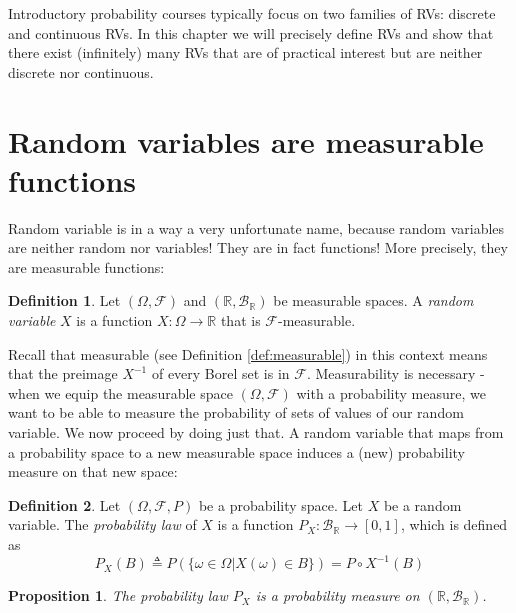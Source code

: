 \documentclass{book}
\theoremstyle{plain}%
\newtheorem{proposition}{Proposition}[section]
\theoremstyle{definition}
\newtheorem{definition}{Definition}[section]
\newlength{\arrow}
\begin{document}
Introductory probability courses typically focus on two families of RVs: discrete and continuous RVs. In this chapter we will precisely define RVs and show that there exist (infinitely) many RVs that are of practical interest but are neither discrete nor continuous.

\section{Random variables are measurable functions}

Random variable is in a way a very unfortunate name, because random variables are neither random nor variables! They are in fact functions! More precisely, they are measurable functions:

\begin{definition}
Let $(\Omega, \mathcal{F})$ and $(\mathbb{R}, \mathcal{B}_\mathbb{R})$ be measurable spaces. A \emph{random variable} $X$ is a function $X: \Omega \rightarrow \mathbb{R}$ that is $\mathcal{F}$-measurable. 
\end{definition}

Recall that measurable (see Definition \ref{def:measurable}) in this context means that the preimage $X^{-1}$ of every Borel set is in $\mathcal{F}$. Measurability is necessary - when we equip the measurable space $(\Omega, \mathcal{F})$ with a probability measure, we want to be able to measure the probability of sets of values of our random variable. We now proceed by doing just that. A random variable that maps from a probability space to a new measurable space induces a (new) probability measure on that new space:

\begin{definition}
Let $(\Omega, \mathcal{F}, P)$ be a probability space. Let $X$ be a random variable. The \emph{probability law} of $X$ is a function $P_X: \mathcal{B}_\mathbb{R} \rightarrow [0,1]$, which is defined as $$P_X(B) \triangleq P(\{\omega \in \Omega | X(\omega) \in B\}) = P \circ X^{-1}(B)$$
\end{definition}

\begin{proposition}
The probability law $P_X$ is a probability measure on $(\mathbb{R},\mathcal{B}_\mathbb{R})$.
\end{proposition}
\end{document}

